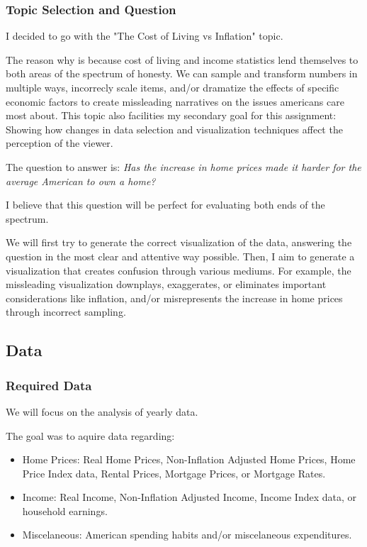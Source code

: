 \documentclass{article}
\begin{document}
\subsubsection{Topic Selection and Question}

I decided to go with the "The Cost of Living vs Inflation" topic.

The reason why is because cost of living and income statistics lend themselves to 
both areas of the spectrum of honesty. We can sample and transform numbers 
in multiple ways, incorrecly scale items, and/or dramatize the effects of 
specific economic factors to create missleading narratives 
on the issues americans care most about. This topic also facilities my secondary goal
for this assignment: Showing how changes in data selection and visualization techniques
affect the perception of the viewer.

The question to answer is: 
\textit{Has the increase in home prices made it harder for the average American to own a home?}

I believe that this question will be perfect for evaluating both ends of the spectrum.

We will first try to generate the correct visualization of the data, answering the question
in the most clear and attentive way possible. Then, I aim to generate a visualization 
that creates confusion through various mediums. For example, the missleading visualization 
downplays, exaggerates, or eliminates important considerations like inflation,
and/or misrepresents the increase in home prices through incorrect sampling.

\subsection{Data}
\subsubsection{Required Data}
We will focus on the analysis of yearly data.

The goal was to aquire data regarding:
\begin{itemize}
  \item Home Prices: Real Home Prices, Non-Inflation Adjusted Home Prices, Home Price
  Index data, Rental Prices, Mortgage Prices, or Mortgage Rates.
  \item Income: Real Income, Non-Inflation Adjusted Income, Income Index data, or 
  household earnings.
  \item Miscelaneous: American spending habits and/or miscelaneous expenditures.
\end{itemize}
\end{document}
